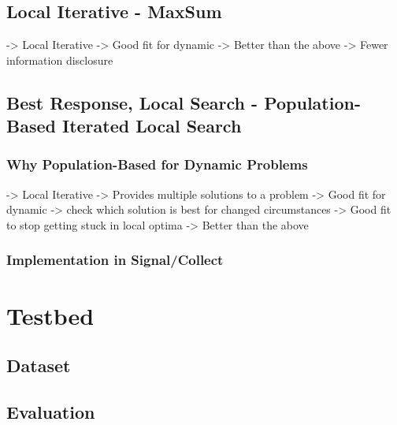 \subsection{Local Iterative - MaxSum}

-> Local Iterative
-> Good fit for dynamic
-> Better than the above
-> Fewer information disclosure

\subsection{Best Response, Local Search - Population-Based Iterated Local Search}
\subsubsection{Why Population-Based for Dynamic Problems}
-> Local Iterative
-> Provides multiple solutions to a problem
-> Good fit for dynamic -> check which solution is best for changed circumstances
-> Good fit to stop getting stuck in local optima
-> Better than the above
\subsubsection{Implementation in Signal/Collect}

\section{Testbed}
\subsection{Dataset}
\subsection{Evaluation}
